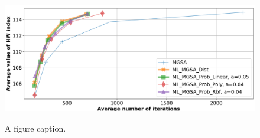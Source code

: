 \documentclass[runningheads]{llncs}
\begin{document}
\begin{figure}
\includegraphics[width=\textwidth]{fig5.png}
\label{fig5}
\caption{A figure caption.} 
\end{figure}


%
%
%
 
 
%
%
%
%
%
\end{document}
